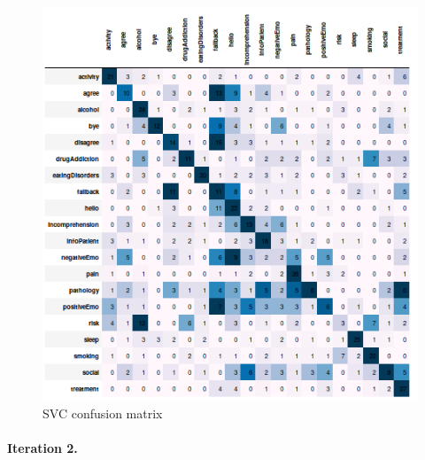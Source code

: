 \documentclass[11pt]{article}
\begin{document}
{\begin{figure}[h]
	\centering
	\includegraphics[scale=0.40]{svc1_cm.png}
	\caption{SVC confusion matrix}
\label{lda_gm_cm}
\end{figure}
\FloatBarrier

\paragraph{Iteration 2.}

}
\end{document}
